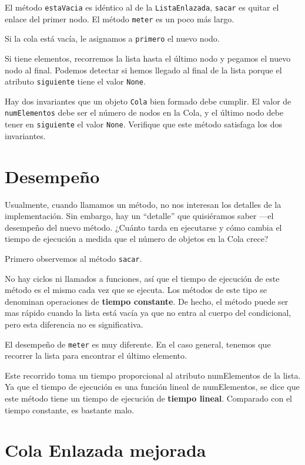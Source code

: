 El método \texttt{estaVacia} es idéntico al de la \texttt{ListaEnlazada},
\texttt{sacar} es quitar el enlace del primer nodo. El método \texttt{meter} 
es un poco más largo.

Si la cola está vacía, le asignamos a {\tt primero} el nuevo nodo.

Si tiene elementos, recorremos la lista hasta el último nodo y 
pegamos el nuevo nodo al final. Podemos detectar si hemos llegado
al final de la lista porque el atributo \texttt{siguiente} tiene el
valor  \texttt{None}.

Hay dos invariantes que un objeto \texttt{Cola} bien formado debe cumplir.
El valor de \texttt{numElementos} debe ser el número de nodos en la 
Cola, y el último nodo debe tener en \texttt{siguiente} el valor
\texttt{None}.  Verifique que este método satisfaga los dos invariantes.


\section{Desempeño}

Usualmente, cuando llamamos un método, no nos interesan los detalles de la
implementación.  Sin embargo, hay un ``detalle'' que quisiéramos saber
---el desempeño del nuevo método.  ¿Cuánto tarda en ejecutarse y cómo
cambia el tiempo de ejecución a medida que el número de objetos en la 
Cola crece?

Primero observemos al método \texttt{sacar}.

No hay ciclos ni llamados a funciones, así que el tiempo de ejecución
de este método es el mismo cada vez que se ejecuta.  Los métodos de 
este tipo se denominan operaciones de  {\bf tiempo constante}. De hecho,
el método puede ser mas rápido cuando la lista está vacía ya que no entra
al cuerpo del condicional, pero esta diferencia no es significativa.


El desempeño de \texttt{meter} es muy diferente. En el caso general,
tenemos que recorrer la lista para encontrar el último elemento.

Este recorrido toma un tiempo proporcional al atributo numElementos de
la lista.  Ya que el tiempo de ejecución es una función lineal de
numElementos, se dice que este método tiene un tiempo de ejecución 
de  {\bf tiempo lineal}.  Comparado con el tiempo constante, es bastante
malo.



\section{Cola Enlazada mejorada}

